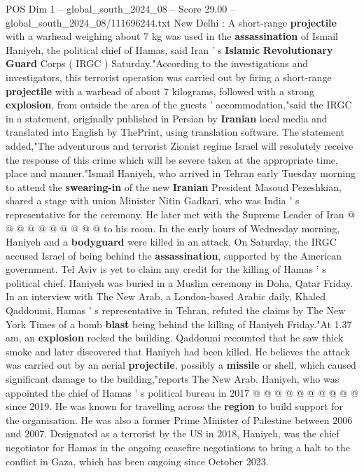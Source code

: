 \begin{textsample}{POS Dim 1 – global\_south\_2024\_08 – Score 29.00 – global\_south\_2024\_08/111696244.txt}  \label{ex:f1_pos_013}
New Delhi : A short-range \textbf{projectile} with a warhead weighing about 7 kg was used in the \textbf{assassination} of Ismail Haniyeh, the political chief of Hamas, said Iran ' s \textbf{Islamic} \textbf{Revolutionary} \textbf{Guard} Corps ( IRGC ) Saturday."According to the investigations and investigators, this terrorist operation was carried out by firing a short-range \textbf{projectile} with a warhead of about 7 kilograms, followed with a strong \textbf{explosion}, from outside the area of the guests ' accommodation,"said the IRGC in a statement, originally published in Persian by \textbf{Iranian} local media and translated into English by ThePrint, using translation software.
The statement added,"The adventurous and terrorist Zionist regime Israel will resolutely receive the response of this crime which will be severe taken at the appropriate time, place and manner."Ismail Haniyeh, who arrived in Tehran early Tuesday morning to attend the \textbf{swearing-in} of the new \textbf{Iranian} President Masoud Pezeshkian, shared a stage with union Minister Nitin Gadkari, who was India ' s representative for the ceremony.
He later met with the Supreme Leader of Iran @ @ @ @ @ @ @ @ @ @ to his room.
In the early hours of Wednesday morning, Haniyeh and a \textbf{bodyguard} were killed in an attack.
On Saturday, the IRGC accused Israel of being behind the \textbf{assassination}, supported by the American government.
Tel Aviv is yet to claim any credit for the killing of Hamas ' s political chief.
Haniyeh was buried in a Muslim ceremony in Doha, Qatar Friday.
In an interview with The New Arab, a London-based Arabic daily, Khaled Qaddoumi, Hamas ' s representative in Tehran, refuted the claims by The New York Times of a bomb \textbf{blast} being behind the killing of Haniyeh Friday."At 1.37 am, an \textbf{explosion} rocked the building.
Qaddoumi recounted that he saw thick smoke and later discovered that Haniyeh had been killed.
He believes the attack was carried out by an aerial \textbf{projectile}, possibly a \textbf{missile} or shell, which caused significant damage to the building,"reports The New Arab.
Haniyeh, who was appointed the chief of Hamas ' s political bureau in 2017 @ @ @ @ @ @ @ @ @ @ since 2019.
He was known for travelling across the \textbf{region} to build support for the organisation.
He was also a former Prime Minister of Palestine between 2006 and 2007.
Designated as a terrorist by the US in 2018, Haniyeh, was the chief negotiator for Hamas in the ongoing ceasefire negotiations to bring a halt to the conflict in Gaza, which has been ongoing since October 2023.

\end{textsample}
